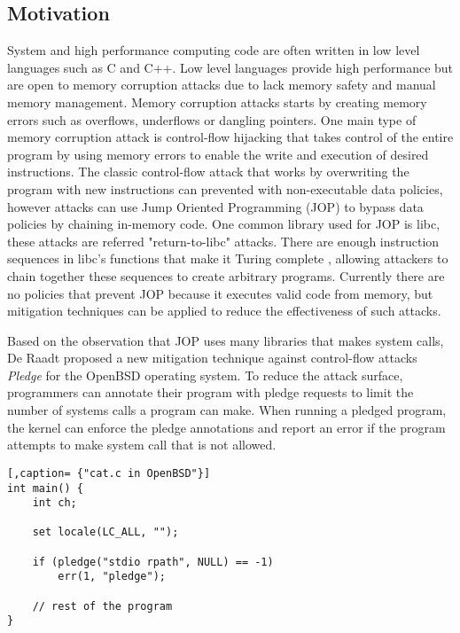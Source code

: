 \subsection{Motivation}

System and high performance computing code are often written in low level languages such as C and C++. Low level languages provide high performance but are open to memory corruption attacks due to lack memory safety and manual memory management. Memory corruption attacks \cite{Szekeres_2013} starts by creating memory errors such as overflows, underflows or dangling pointers. One main type of memory corruption attack is control-flow hijacking that takes control of the entire program by using memory errors to enable the write and execution of desired instructions. The classic control-flow attack that works by overwriting the program with new instructions can prevented with non-executable data policies, however attacks can use Jump Oriented Programming (JOP) to bypass data policies by chaining in-memory code. One common library used for JOP is libc, these attacks are referred "return-to-libc" attacks. There are enough instruction sequences in libc's functions that make it Turing complete \cite{Tran_2011}, allowing attackers to chain together these sequences to create arbitrary programs. Currently there are no policies that prevent JOP because it executes valid code from memory, but mitigation techniques \cite{Li_2010, Pappas_2012, pledge} can be applied to reduce the effectiveness of such attacks.

Based on the observation that JOP uses many libraries that makes system calls, De Raadt proposed a new mitigation technique against control-flow attacks \textit{Pledge}\cite{pledge} for the OpenBSD operating system. To reduce the attack surface, programmers can annotate their program with pledge\cite{pledge2} requests to limit the number of systems calls a program can make. When running a pledged program, the kernel can enforce the pledge annotations and report an error if the program attempts to make system call that is not allowed. 

\begin{verbatim}[,caption= {"cat.c in OpenBSD"}]
int main() {
    int ch;
    
    set locale(LC_ALL, "");
    
    if (pledge("stdio rpath", NULL) == -1)
        err(1, "pledge");
        
    // rest of the program
}
\end{verbatim}